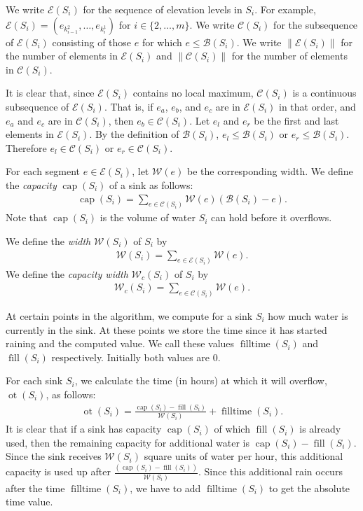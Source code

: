 \documentclass[11pt,a4paper]{article}
\newcommand{\norm}[1]{\left\lVert #1 \right\rVert}
\DeclareMathOperator{\capp}{cap}
\DeclareMathOperator{\ot}{ot}
\DeclareMathOperator{\Fill}{fill}
\DeclareMathOperator{\filltime}{filltime}
\begin{document}
We write $\mathcal{E}(S_i)$ for the sequence of elevation levels in $S_i$.
For example, $\mathcal{E}(S_i) = (e_{k_{i-1}^2},\ldots,e_{k_i^1})$ for $i\in\{2,\ldots,m\}$.
We write $\mathcal{C}(S_i)$ for the subsequence of $\mathcal{E}(S_i)$ consisting of those $e$ for which $e \le \mathcal{B}(S_i)$.
We write $\norm{\mathcal{E}(S_i)}$ for the number of elements in $\mathcal{E}(S_i)$ and $\norm{\mathcal{C}(S_i)}$ for the number of elements in $\mathcal{C}(S_i)$.

It is clear that, since $\mathcal{E}(S_i)$ contains no local maximum, $\mathcal{C}(S_i)$ is a continuous subsequence of $\mathcal{E}(S_i)$.
That is, if $e_a$, $e_b$, and $e_c$ are in $\mathcal{E}(S_i)$ in that order, and $e_a$ and $e_c$ are in $\mathcal{C}(S_i)$, then $e_b\in\mathcal{C}(S_i)$.
Let $e_l$ and $e_r$ be the first and last elements in $\mathcal{E}(S_i)$.
By the definition of $\mathcal{B}(S_i)$, $e_l\le\mathcal{B}(S_i)$ or $e_r\le\mathcal{B}(S_i)$.
Therefore $e_l\in\mathcal{C}(S_i)$ or $e_r\in\mathcal{C}(S_i)$.

For each segment $e\in\mathcal{E}(S_i)$, let $\mathcal{W}(e)$ be the corresponding width.
We define the \textit{capacity} $\capp(S_i)$ of a sink as follows:
\begin{align*}
    \capp(S_i) = \sum_{e\in\mathcal{C}(S_i)} \mathcal{W}(e)(\mathcal{B}(S_i)-e).
\end{align*}
Note that $\capp(S_i)$ is the volume of water $S_i$ can hold before it overflows.

We define the \textit{width} $\mathcal{W}(S_i)$ of $S_i$ by
\begin{align*}
    \mathcal{W}(S_i) = \sum_{e\in\mathcal{E}(S_i)} \mathcal{W}(e).
\end{align*}
We define the \textit{capacity width} $\mathcal{W}_c(S_i)$ of $S_i$ by
\begin{align*}
    \mathcal{W}_c(S_i) = \sum_{e\in\mathcal{C}(S_i)} \mathcal{W}(e).
\end{align*}

At certain points in the algorithm, we compute for a sink $S_i$ how much water is currently in the sink.
At these points we store the time since it has started raining and the computed value.
We call these values $\filltime(S_i)$ and $\Fill(S_i)$ respectively.
Initially both values are $0$.

For each sink $S_i$, we calculate the time (in hours) at which it will overflow, $\ot(S_i)$, as follows:
\begin{align*}
    \ot(S_i) = \frac{\capp(S_i) - \Fill(S_i)}{\mathcal{W}(S_i)} + \filltime(S_i).
\end{align*}
It is clear that if a sink has capacity $\capp(S_i)$ of which $\Fill(S_i)$ is already used, then the remaining capacity for additional water is $\capp(S_i) - \Fill(S_i)$.
Since the sink receives $\mathcal{W}(S_i)$ square units of water per hour, this additional capacity is used up after $\frac{(\capp(S_i) - \Fill(S_i))}{\mathcal{W}(S_i)}$.
Since this additional rain occurs after the time $\filltime(S_i)$, we have to add $\filltime(S_i)$ to get the absolute time value.
\end{document}
